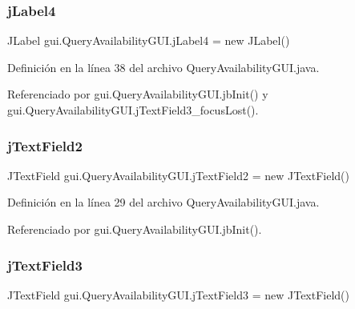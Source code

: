 \subsubsection{\texorpdfstring{jLabel4}{jLabel4}}
{\footnotesize\ttfamily J\+Label gui.\+Query\+Availability\+G\+U\+I.\+j\+Label4 = new J\+Label()\hspace{0.3cm}{\ttfamily [private]}}



Definición en la línea 38 del archivo Query\+Availability\+G\+U\+I.\+java.



Referenciado por gui.\+Query\+Availability\+G\+U\+I.\+jb\+Init() y gui.\+Query\+Availability\+G\+U\+I.\+j\+Text\+Field3\+\_\+focus\+Lost().

\mbox{\label{classgui_1_1_query_availability_g_u_i_a66e9188aba0953b1351d11ff8019583c}} 
\subsubsection{\texorpdfstring{jTextField2}{jTextField2}}
{\footnotesize\ttfamily J\+Text\+Field gui.\+Query\+Availability\+G\+U\+I.\+j\+Text\+Field2 = new J\+Text\+Field()\hspace{0.3cm}{\ttfamily [private]}}



Definición en la línea 29 del archivo Query\+Availability\+G\+U\+I.\+java.



Referenciado por gui.\+Query\+Availability\+G\+U\+I.\+jb\+Init().

\mbox{\label{classgui_1_1_query_availability_g_u_i_a330893db57be56c4b286eae0fe93392f}} 
\subsubsection{\texorpdfstring{jTextField3}{jTextField3}}
{\footnotesize\ttfamily J\+Text\+Field gui.\+Query\+Availability\+G\+U\+I.\+j\+Text\+Field3 = new J\+Text\+Field()\hspace{0.3cm}{\ttfamily [private]}}



